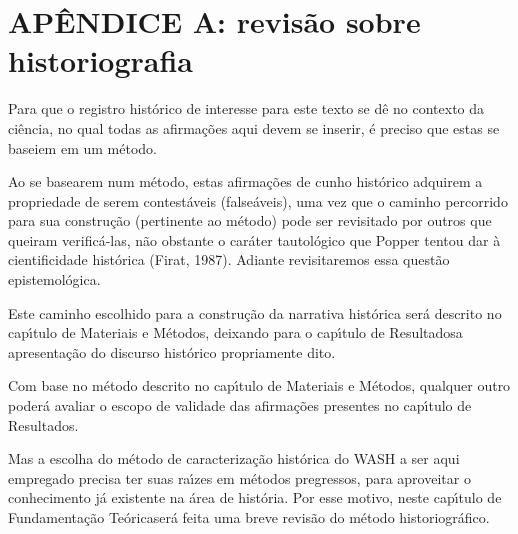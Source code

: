 \documentclass[
12pt,		%
openright,	%
twoside,  %
a4paper,			%
chapter=TITLE,		%
english,			%
french,				%
spanish,			%
brazil				%
]{USPSC-classe/USPSC}
\begin{document}
\chapter[AP\^ENDICE A: revis\~ao sobre historiografia]{AP\^ENDICE A: revis\~ao sobre historiografia}\label{AP\^ENDICE A: revis\~ao sobre historiografia}
Para que o registro hist\'orico de interesse para este texto se d\^e no contexto da ci\^encia, no qual todas as afirma\c{c}\~oes aqui devem se inserir, \'e preciso que estas se baseiem em um m\'etodo.









Ao se basearem num m\'etodo, estas afirma\c{c}\~oes de cunho hist\'orico adquirem a propriedade de serem contest\'aveis (false\'aveis), uma vez que o caminho percorrido para sua constru\c{c}\~ao (pertinente ao m\'etodo) pode ser revisitado por outros que queiram verific\'a-las, n\~ao obstante o car\'ater tautol\'ogico que Popper tentou dar \`a cientificidade hist\'orica  (Firat, 1987). Adiante revisitaremos essa quest\~ao epistemol\'ogica.









Este caminho escolhido para a constru\c{c}\~ao da narrativa hist\'orica ser\'a descrito no cap\'{\i}tulo de \textquotedbl Materiais e M\'etodos\textquotedbl , deixando para o cap\'{\i}tulo de \textquotedbl Resultados\textquotedbl  a apresenta\c{c}\~ao do discurso hist\'orico propriamente dito.









Com base no m\'etodo descrito no cap\'{\i}tulo de \textquotedbl Materiais e M\'etodos\textquotedbl , qualquer outro poder\'a avaliar o escopo de validade das afirma\c{c}\~oes presentes no cap\'{\i}tulo de \textquotedbl Resultados\textquotedbl .









Mas a escolha do m\'etodo de caracteriza\c{c}\~ao hist\'orica do WASH a ser aqui empregado precisa ter suas ra\'{\i}zes em m\'etodos pregressos, para aproveitar o conhecimento j\'a existente na \'area de hist\'oria. Por esse motivo, neste cap\'{\i}tulo de \textquotedbl Fundamenta\c{c}\~ao Te\'orica\textquotedbl  ser\'a feita uma breve revis\~ao do m\'etodo historiogr\'afico.
\end{document}
